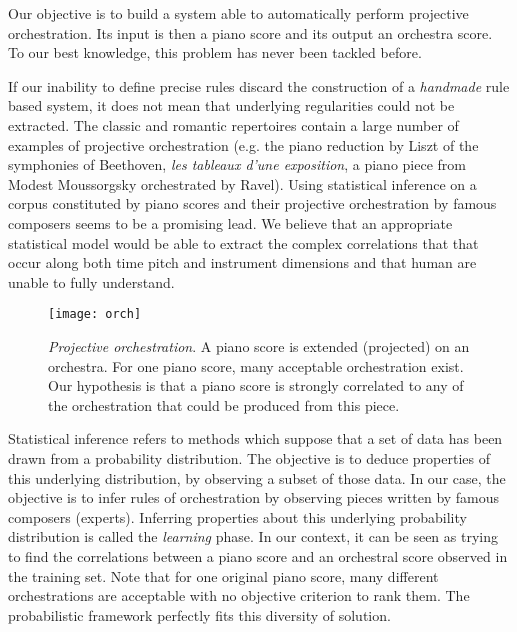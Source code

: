 \documentclass[letterpaper]{article}
\begin{document}
Our objective is to build a system able to automatically perform projective orchestration. Its input is then a piano score and its output an orchestra score. To our best knowledge, this problem has never been tackled before.

If our inability to define precise rules discard the construction of a \textit{handmade} rule based system, it does not mean that underlying regularities could not be extracted. The classic and romantic repertoires contain a large number of examples of projective orchestration (e.g. the piano reduction by Liszt of the symphonies of Beethoven, \textit{les tableaux d'une exposition}, a piano piece from Modest Moussorgsky orchestrated by Ravel). Using statistical inference on a corpus constituted by piano scores and their projective orchestration by famous composers seems to be a promising lead. We believe that an appropriate statistical model would be able to extract the complex correlations that that occur along both time pitch and instrument dimensions and that human are unable to fully understand.


\begin{figure}
\centering
\texttt{[image: orch]}
\caption{\textit{Projective orchestration}. A piano score is extended (projected) on an orchestra. For one piano score, many acceptable orchestration exist. Our hypothesis is that a piano score is strongly correlated to any of the orchestration that could be produced from this piece.}
\label{fig:orch}
\end{figure}

Statistical inference refers to methods which suppose that a set of data has been drawn from a probability distribution. The objective is to deduce properties of this underlying distribution, by observing a subset of those data. In our case, the objective is to infer rules of orchestration by observing pieces written by famous composers (experts). Inferring properties about this underlying probability distribution is called the \textit{learning} phase.
In our context, it can be seen as trying to find the correlations between a piano score and an orchestral score observed in the training set. Note that for one original piano score, many different orchestrations are acceptable with no objective criterion to rank them. The probabilistic framework perfectly fits this diversity of solution.
\end{document}
